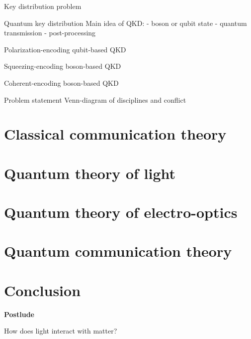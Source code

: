 \documentclass{beamer}
\begin{document}
	\begin{frame}{Key distribution problem}
	\end{frame}
	
	\begin{frame}{Quantum key distribution}
		Main idea of QKD:
		- boson or qubit state
		- quantum transmission
		- post-processing
	\end{frame}
	
	\begin{frame}{Polarization-encoding qubit-based QKD}
		
	\end{frame}
	
	\begin{frame}{Squeezing-encoding boson-based QKD}
		
	\end{frame}
	
	\begin{frame}{Coherent-encoding boson-based QKD}
		
	\end{frame}
	
	\begin{frame}{Problem statement}
		Venn-diagram of disciplines
		and 
		conflict
	\end{frame}
	
	\section{Classical communication theory}
	
	\section{Quantum theory of light}
	
	\section{Quantum theory of electro-optics}
	
	\section{Quantum communication theory}
	
	\section{Conclusion}
	
	\begin{frame}
		\begin{center}
			\textbf{Postlude}
			
			How does light interact with matter?
		\end{center}
	\end{frame}
\end{document}
